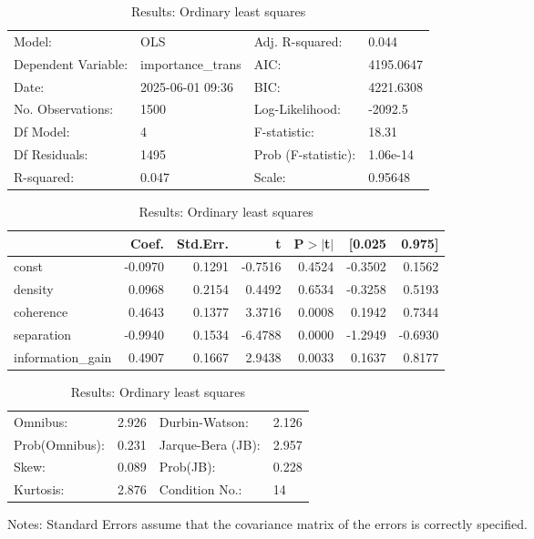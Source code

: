 \begin{table}
\caption{Results: Ordinary least squares}
\label{}
\begin{center}
\begin{tabular}{llll}
\hline
Model:              & OLS               & Adj. R-squared:     & 0.044      \\
Dependent Variable: & importance\_trans & AIC:                & 4195.0647  \\
Date:               & 2025-06-01 09:36  & BIC:                & 4221.6308  \\
No. Observations:   & 1500              & Log-Likelihood:     & -2092.5    \\
Df Model:           & 4                 & F-statistic:        & 18.31      \\
Df Residuals:       & 1495              & Prob (F-statistic): & 1.06e-14   \\
R-squared:          & 0.047             & Scale:              & 0.95648    \\
\hline
\end{tabular}
\end{center}

\begin{center}
\begin{tabular}{lrrrrrr}
\hline
                  &   Coef. & Std.Err. &       t & P$> |$t$|$ &  [0.025 &  0.975]  \\
\hline
const             & -0.0970 &   0.1291 & -0.7516 &      0.4524 & -0.3502 &  0.1562  \\
density           &  0.0968 &   0.2154 &  0.4492 &      0.6534 & -0.3258 &  0.5193  \\
coherence         &  0.4643 &   0.1377 &  3.3716 &      0.0008 &  0.1942 &  0.7344  \\
separation        & -0.9940 &   0.1534 & -6.4788 &      0.0000 & -1.2949 & -0.6930  \\
information\_gain &  0.4907 &   0.1667 &  2.9438 &      0.0033 &  0.1637 &  0.8177  \\
\hline
\end{tabular}
\end{center}

\begin{center}
\begin{tabular}{llll}
\hline
Omnibus:       & 2.926 & Durbin-Watson:    & 2.126  \\
Prob(Omnibus): & 0.231 & Jarque-Bera (JB): & 2.957  \\
Skew:          & 0.089 & Prob(JB):         & 0.228  \\
Kurtosis:      & 2.876 & Condition No.:    & 14     \\
\hline
\end{tabular}
\end{center}
\end{table}
\bigskip
Notes: \newline 
[1] Standard Errors assume that the covariance matrix of the errors is correctly specified.